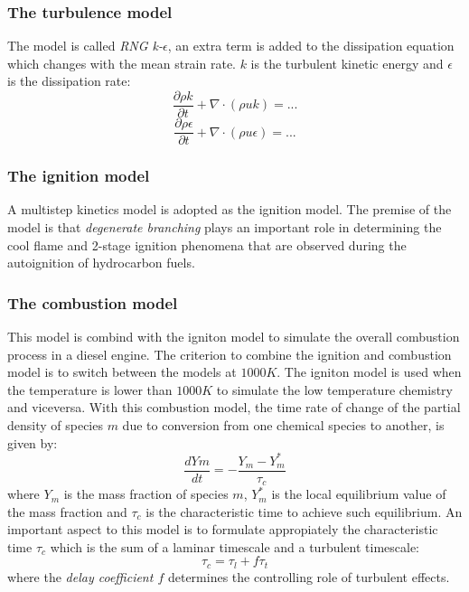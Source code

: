 \documentclass[12pt]{article}
\begin{document}
\subsubsection{The turbulence model}

The model is called \textit{RNG k-$\epsilon$}, an extra term is added to the dissipation equation which changes with the mean strain rate.
$k$ is the turbulent kinetic energy and $\epsilon$ is the dissipation rate:
\begin{equation}
    \frac{\partial \rho k}{\partial t}+\nabla\cdot(\rho u k)=...
\end{equation}
\begin{equation}
    \frac{\partial\rho\epsilon}{\partial t}+\nabla\cdot(\rho u \epsilon)=...
\end{equation}

\subsubsection{The ignition model}

A multistep kinetics model is adopted as the ignition model. The premise of the model is that \textit{degenerate branching} plays an important role in determining the cool flame and 2-stage ignition phenomena that are observed during the autoignition of hydrocarbon fuels.

\subsubsection{The combustion model}

This model is combind with the igniton model to simulate the overall combustion process in a diesel engine. The criterion to combine the ignition and combustion model is to switch between the models at $1000 K$. The igniton model is used when the temperature is lower than $1000 K$ to simulate the low temperature chemistry and viceversa. With this combustion model, the time rate of change of the partial density of species $m$ due to conversion from one chemical species to another, is given by:
\begin{equation}
    \frac{dY{m}}{dt}=-\frac{Y_{m}-Y_{m}^{*}}{\tau_{c}}
\end{equation}
where $Y_{m}$ is the mass fraction of species $m$, $Y_{m}^{*}$ is the local equilibrium value of the mass fraction and $\tau_{c}$ is the characteristic time to achieve such equilibrium. An important aspect to this model is to formulate appropiately the characteristic time $\tau_{c}$ which is the sum of a laminar timescale and a turbulent timescale:
\begin{equation}
    \tau_{c}=\tau_{l}+f\tau_{t}
\end{equation}
where the \textit{delay coefficient $f$} determines the controlling role of turbulent effects.
\end{document}
